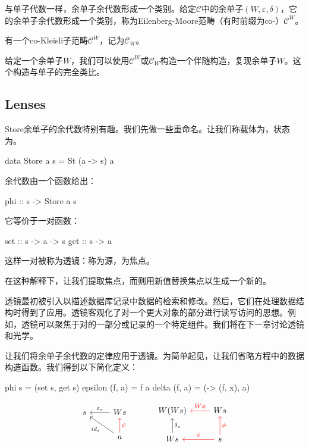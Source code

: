 \documentclass[DaoFP]{subfiles}
\begin{document}
与单子代数一样，余单子余代数形成一个类别。给定$\mathcal{C}$中的余单子$(W, \varepsilon, \delta)$，它的余单子余代数形成一个类别，称为Eilenberg-Moore范畴（有时前缀为co-）$\mathcal{C}^W$。

有一个co-Kleisli子范畴$\mathcal{C}^W$，记为$\mathcal{C}_W$。

给定一个余单子$W$，我们可以使用$\mathcal{C}^W$或$\mathcal{C}_W$构造一个伴随构造，复现余单子$W$。这个构造与单子的完全类比。

\subsection{Lenses}

Store余单子的余代数特别有趣。我们先做一些重命名。让我们称载体为，状态为。
\begin{haskell}
data Store a s = St (a -> s) a
\end{haskell}
余代数由一个函数给出：
\begin{haskell}
phi :: s -> Store a s
\end{haskell}
它等价于一对函数：
\begin{haskell}
set :: s -> a -> s
get :: s -> a
\end{haskell}
这样一对被称为透镜：称为源，为焦点。

在这种解释下，让我们提取焦点，而则用新值替换焦点以生成一个新的。

透镜最初被引入以描述数据库记录中数据的检索和修改。然后，它们在处理数据结构时得到了应用。透镜客观化了对一个更大对象的部分进行读写访问的思想。例如，透镜可以聚焦于对的一部分或记录的一个特定组件。我们将在下一章讨论透镜和光学。

让我们将余单子余代数的定律应用于透镜。为简单起见，让我们省略方程中的数据构造函数。我们得到以下简化定义：
\begin{haskell}
phi s = (set s, get s)
epsilon (f, a) = f a
delta (f, a) = (\x -> (f, x), a)
\end{haskell}

\[
\begin{tikzcd}
s
& W s
\arrow[l, "\varepsilon_s"']
\\
& a
\arrow[ul, "id_s"]
\arrow[u, red, "\phi"']
\end{tikzcd}
\hspace{30pt}
\begin{tikzcd}
W(W s)
&W s
\arrow[l, red, "W \phi "']
\\
W s
\arrow[u, "\delta_s"']
& s
\arrow[l, red, "\phi"']
\arrow[u, red, "\phi"']
\end{tikzcd}
\]
\end{document}
